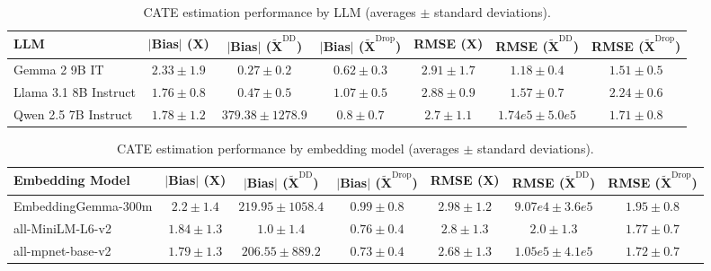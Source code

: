 \begin{table}[ht!]
    \centering
    \small
    \caption{CATE estimation performance by LLM (averages $\pm$ standard deviations).}
    \begin{sc}
    \begin{tabular}{lcccccc}
    \toprule
    \textbf{LLM} & \textbf{$|$Bias$|$ ($\mathbf{X}$)} & \textbf{$|$Bias$|$ ($\mathbf{\widetilde{X}}^{\textrm{DD}}$)} & \textbf{$|$Bias$|$ ($\mathbf{\widetilde{X}}^{\textrm{Drop}}$)} & \textbf{RMSE ($\mathbf{X}$)} & \textbf{RMSE ($\mathbf{\widetilde{X}}^{\textrm{DD}}$)} & \textbf{RMSE ($\mathbf{\widetilde{X}}^{\textrm{Drop}}$)}\\
    \midrule
    Gemma 2 9B IT & $2.33 \pm 1.9$ & $\mathbf{0.27 \pm 0.2}$ & $\mathbf{0.62 \pm 0.3}$ & $2.91 \pm 1.7$ & $\mathbf{1.18 \pm 0.4}$ & $\mathbf{1.51 \pm 0.5}$\\Llama 3.1 8B Instruct & $\mathbf{1.76 \pm 0.8}$ & $0.47 \pm 0.5$ & $1.07 \pm 0.5$ & $2.88 \pm 0.9$ & $1.57 \pm 0.7$ & $2.24 \pm 0.6$\\Qwen 2.5 7B Instruct & $1.78 \pm 1.2$ & $379.38 \pm 1278.9$ & $0.8 \pm 0.7$ & $\mathbf{2.7 \pm 1.1}$ & $1.74e5 \pm 5.0e5$ & $1.71 \pm 0.8$\\
    \bottomrule
    \end{tabular}
    \end{sc}
    \end{table}

\begin{table}[ht!]
    \centering
    \small
    \caption{CATE estimation performance by embedding model (averages $\pm$ standard deviations).}
    \begin{sc}
    \begin{tabular}{lcccccc}
    \toprule
    \textbf{Embedding Model} & \textbf{$|$Bias$|$ ($\mathbf{X}$)} & \textbf{$|$Bias$|$ ($\mathbf{\widetilde{X}}^{\textrm{DD}}$)} & \textbf{$|$Bias$|$ ($\mathbf{\widetilde{X}}^{\textrm{Drop}}$)} & \textbf{RMSE ($\mathbf{X}$)} & \textbf{RMSE ($\mathbf{\widetilde{X}}^{\textrm{DD}}$)} & \textbf{RMSE ($\mathbf{\widetilde{X}}^{\textrm{Drop}}$)}\\
    \midrule
    EmbeddingGemma-300m  & $2.2 \pm 1.4$ & $219.95 \pm 1058.4$ & $0.99 \pm 0.8$ & $2.98 \pm 1.2$ & $9.07e4 \pm 3.6e5$ & $1.95 \pm 0.8$\\all-MiniLM-L6-v2 & $1.84 \pm 1.3$ & $\mathbf{1.0 \pm 1.4}$ & $0.76 \pm 0.4$ & $2.8 \pm 1.3$ & $\mathbf{2.0 \pm 1.3}$ & $1.77 \pm 0.7$\\all-mpnet-base-v2  & $\mathbf{1.79 \pm 1.3}$ & $206.55 \pm 889.2$ & $\mathbf{0.73 \pm 0.4}$ & $\mathbf{2.68 \pm 1.3}$ & $1.05e5 \pm 4.1e5$ & $\mathbf{1.72 \pm 0.7}$\\
    \bottomrule
    \end{tabular}
    \end{sc}
    \end{table}

